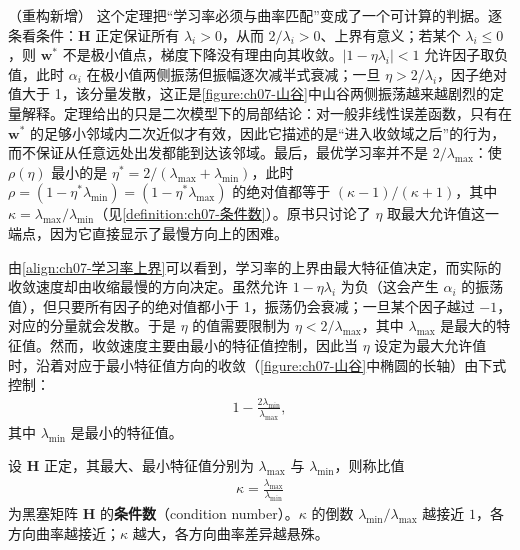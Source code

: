 \documentclass[../../main.tex]{subfiles}
\begin{document}
\begin{remark}（重构新增）
这个定理把“学习率必须与曲率匹配”变成了一个可计算的判据。逐条看条件：$\mathbf{H}$ 正定保证所有 $\lambda_i>0$，从而 $2/\lambda_i>0$、上界有意义；若某个 $\lambda_i\leqslant0$，则 $\mathbf{w}^{\ast}$ 不是极小值点，梯度下降没有理由向其收敛。$|1-\eta\lambda_i|<1$ 允许因子取负值，此时 $\alpha_i$ 在极小值两侧振荡但振幅逐次减半式衰减；一旦 $\eta>2/\lambda_i$，因子绝对值大于 1，该分量发散，这正是\cref{figure:ch07-山谷}中山谷两侧振荡越来越剧烈的定量解释。定理给出的只是二次模型下的局部结论：对一般非线性误差函数，只有在 $\mathbf{w}^{\ast}$ 的足够小邻域内二次近似才有效，因此它描述的是“进入收敛域之后”的行为，而不保证从任意远处出发都能到达该邻域。最后，最优学习率并不是 $2/\lambda_{\max}$：使 $\rho(\eta)$ 最小的是 $\eta^{\ast}=2/(\lambda_{\max}+\lambda_{\min})$，此时 $\rho=(1-\eta^{\ast}\lambda_{\min})=(1-\eta^{\ast}\lambda_{\max})$ 的绝对值都等于 $(\kappa-1)/(\kappa+1)$，其中 $\kappa=\lambda_{\max}/\lambda_{\min}$（见\cref{definition:ch07-条件数}）。原书只讨论了 $\eta$ 取最大允许值这一端点，因为它直接显示了最慢方向上的困难。
\end{remark}

由\eqref{align:ch07-学习率上界}可以看到，学习率的上界由最大特征值决定，而实际的收敛速度却由收缩最慢的方向决定。虽然允许 $1-\eta\lambda_i$ 为负（这会产生 $\alpha_i$ 的振荡值），但只要所有因子的绝对值都小于 1，振荡仍会衰减；一旦某个因子越过 $-1$，对应的分量就会发散。于是 $\eta$ 的值需要限制为 $\eta<2/\lambda_{\max}$，其中 $\lambda_{\max}$ 是最大的特征值。然而，收敛速度主要由最小的特征值控制，因此当 $\eta$ 设定为最大允许值时，沿着对应于最小特征值方向的收敛（\cref{figure:ch07-山谷}中椭圆的长轴）由下式控制：
\begin{align}
1-\frac{2\lambda_{\min}}{\lambda_{\max}},
\label{align:ch07-最慢因子}
\end{align}
其中 $\lambda_{\min}$ 是最小的特征值。

\begin{definition}[条件数]\label{definition:ch07-条件数}
设 $\mathbf{H}$ 正定，其最大、最小特征值分别为 $\lambda_{\max}$ 与 $\lambda_{\min}$，则称比值
\begin{align}
\kappa = \frac{\lambda_{\max}}{\lambda_{\min}}
\label{align:ch07-条件数}
\end{align}
为黑塞矩阵 $\mathbf{H}$ 的\textbf{条件数}（condition number）。$\kappa$ 的倒数 $\lambda_{\min}/\lambda_{\max}$ 越接近 $1$，各方向曲率越接近；$\kappa$ 越大，各方向曲率差异越悬殊。
\end{definition}
\end{document}

